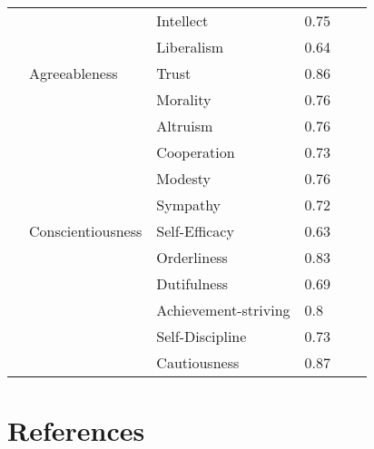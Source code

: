 \documentclass[man]{apa6}
\theoremstyle{definition}
\theoremstyle{definition}
\theoremstyle{definition}
\theoremstyle{remark}
\begin{document}
\begin{table}[1]
\begin{tabular}{llllll}
             &                        & Intellect            & 0.75        &          &              \\
             &                        & Liberalism           & 0.64        &          &              \\
             & Agreeableness          & Trust                & 0.86        &          &              \\
             &                        & Morality             & 0.76        &          &              \\
             &                        & Altruism             & 0.76        &          &              \\
             &                        & Cooperation          & 0.73        &          &              \\
             &                        & Modesty              & 0.76        &          &              \\
             &                        & Sympathy             & 0.72        &          &              \\
             & Conscientiousness      & Self-Efficacy        & 0.63        &          &              \\
             &                        & Orderliness          & 0.83        &          &              \\
             &                        & Dutifulness          & 0.69        &          &              \\
             &                        & Achievement-striving & 0.8         &          &              \\
             &                        & Self-Discipline      & 0.73        &          &              \\
             &                        & Cautiousness         & 0.87        &          &             
\end{tabular}
\end{table}

\hypertarget{references}{%
\section{References}\label{references}}

\begingroup
\setlength{\parindent}{-0.5in}
\setlength{\leftskip}{0.5in}

\hypertarget{refs}{}

\endgroup
\end{document}
